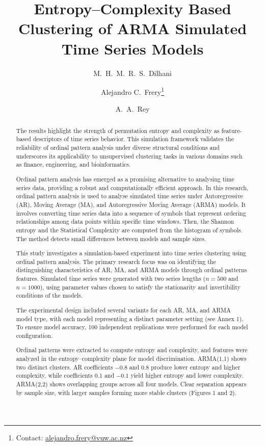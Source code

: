 \documentclass[11pt,a4paper]{article}
\title{\vspace{-1cm}Entropy–Complexity Based Clustering of ARMA Simulated Time Series Models\vspace{-0.3cm}}
\author[1]{M.\ H.\ M.\ R.\ S.\ Dilhani}
\author[1]{Alejandro C.\ Frery\thanks{Contact: \href{mailto:alejandro.frery@vuw.ac.nz}{alejandro.frery@vuw.ac.nz}}}
\author[2]{A.\ A.\ Rey}
\affil[1]{School of Mathematics and Statistics, Victoria University of Wellington, New Zealand}
\affil[2]{Laboratorio de Investigación y Desarrollo Experimental en Computación (LIDEC),\\
	Instituto de Tecnología e Ingeniería, Universidad Nacional de Hurlingham (UNAHUR), Argentina}
\date{}
\begin{document}
	\maketitle
	\vspace{-0.5cm}
	
	\begin{abstract}
		
				
		The results highlight the strength of permutation entropy and complexity as feature-based descriptors of time series behavior. This simulation framework validates the reliability of ordinal pattern analysis under diverse structural conditions and underscores its applicability to unsupervised clustering tasks in various domains such as finance, engineering, and bioinformatics.
		
		Ordinal pattern analysis has emerged as a promising alternative to analysing time series data, providing a robust and computationally efficient approach. In this research, ordinal pattern analysis is used to analyse simulated time series under Autoregressive (AR), Moving Average (MA), and Autoregressive Moving Average (ARMA) models. It involves converting time series data into a sequence of symbols that represent ordering relationships among data points within specific time windows. Then, the Shannon entropy and the Statistical Complexity are computed from the histogram of symbols. The method detects small differences between models and sample sizes.
		
		This study investigates a simulation-based experiment into time series clustering using ordinal pattern analysis. The primary research focus was on identifying the distinguishing characteristics of AR, MA, and ARMA models through ordinal patterns features. Simulated time series were generated with two series lengths ($n = 500$ and $n = 1000$), using parameter values chosen to satisfy the stationarity and invertibility conditions of the models.
		
		The experimental design included several variants for each AR, MA, and ARMA model type, with each model representing a distinct parameter setting (see Annex 1). To ensure model accuracy, 100 independent replications were performed for each model configuration.
		
		Ordinal patterns were extracted to compute entropy and complexity, and features were analyzed in the entropy–complexity plane for model discrimination. ARMA(1,1) shows two distinct clusters. AR coefficients $-0.8$ and $0.8$ produce lower entropy and higher complexity, while coefficients $0.1$ and $-0.1$ yield higher entropy and lower complexity. ARMA(2,2) shows overlapping groups across all four models. Clear separation appears by sample size, with larger samples forming more stable clusters (Figures 1 and 2).
		

\end{abstract}
\end{document}
